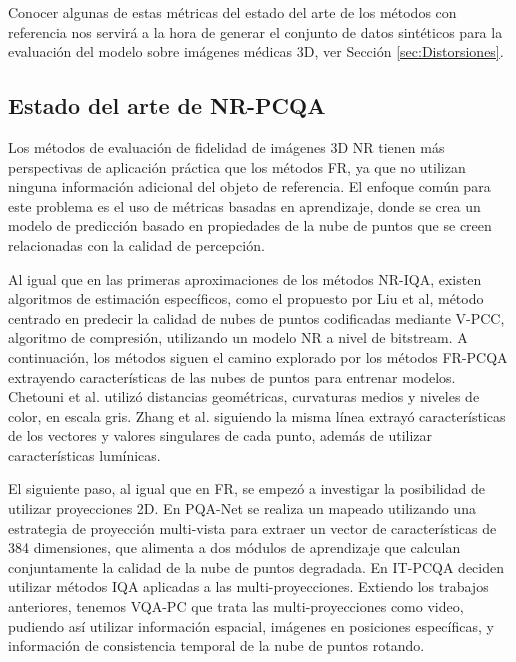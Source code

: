 Conocer algunas de estas métricas del estado del arte de los métodos con referencia nos 
servirá a la hora de generar el conjunto de datos sintéticos para la evaluación 
del modelo sobre imágenes médicas 3D, ver Sección \ref{sec:Distorsiones}. 

\subsection{Estado del arte de NR-PCQA}
Los métodos de evaluación de fidelidad de imágenes 3D NR tienen más perspectivas 
de aplicación práctica que los métodos FR, ya que no utilizan ninguna información 
adicional del objeto de referencia.
El enfoque común para este problema es el uso de métricas basadas en 
aprendizaje, donde se crea un modelo de predicción basado en propiedades de la 
nube de puntos que se creen relacionadas con la calidad de percepción.

Al igual que en las primeras aproximaciones de los métodos NR-IQA, existen 
algoritmos de estimación específicos, como el propuesto por Liu et al\cite{bitstreamPCQ},
método centrado en predecir la calidad de nubes de puntos 
codificadas mediante V-PCC, algoritmo de compresión, utilizando un modelo NR 
a nivel de bitstream. A continuación, los métodos siguen el camino explorado 
por los métodos FR-PCQA extrayendo características de las nubes de puntos para 
entrenar modelos.  Chetouni et al.\cite{NR-CNN-3D-PC} utilizó distancias geométricas, curvaturas medios 
y niveles de color, en escala gris. Zhang et al.\cite{NR3DQA} siguiendo la misma 
línea extrayó características de los vectores y valores singulares de cada punto,
además de utilizar características lumínicas.

El siguiente paso, al igual que en FR, se empezó a investigar la posibilidad 
de utilizar proyecciones 2D. En PQA-Net\cite{PQA-Net} se realiza un mapeado 
utilizando una estrategia de proyección multi-vista para extraer un vector de 
características de 384 dimensiones, que alimenta a dos módulos de aprendizaje 
que calculan conjuntamente la calidad de la nube de puntos degradada. 
En IT-PCQA\cite{IT-PCQA} deciden utilizar métodos IQA aplicadas a las multi-proyecciones.
Extiendo los trabajos anteriores, tenemos VQA-PC\cite{VQA-PC} que trata las 
multi-proyecciones como video, pudiendo así utilizar información espacial, 
imágenes en posiciones específicas, y información de consistencia temporal 
de la nube de puntos rotando. 


